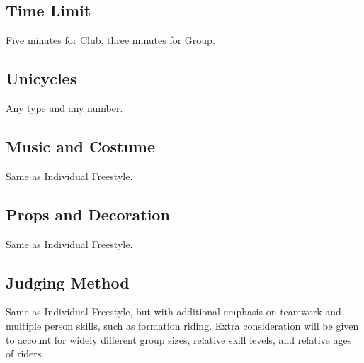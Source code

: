 \subsection{Time Limit}
Five minutes for Club, three minutes for Group.

\subsection{Unicycles}
Any type and any number.

\subsection{Music and Costume}
Same as Individual Freestyle.

\subsection{Props and Decoration}
Same as Individual Freestyle.

\subsection{Judging Method}
Same as Individual Freestyle, but with additional emphasis on teamwork and multiple person skills, such as formation riding.
Extra consideration will be given to account for widely different group sizes, relative skill levels, and relative ages of riders.
